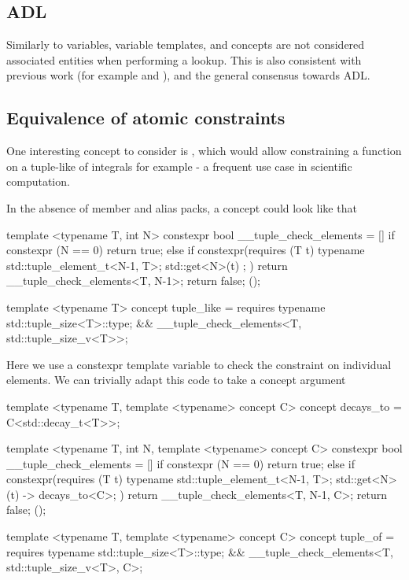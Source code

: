 \documentclass{wg21}
\begin{document}
\subsection{ADL}

Similarly to variables, variable templates, and concepts are not considered associated entities
when performing a lookup. This is also consistent with previous work (for example  and ),
and the general consensus towards ADL.

\subsection{Equivalence of atomic constraints}

One interesting concept to consider is , which would allow constraining a function on a tuple-like of integrals for example - a frequent use case in scientific
computation.

In the absence of member and alias packs, a  concept could look like that

\begin{colorblock}
template <typename T, int N>
constexpr bool __tuple_check_elements = [] {
    if constexpr (N == 0)
    return true;
    else if constexpr(requires (T t) {
        typename std::tuple_element_t<N-1, T>;
        { std::get<N>(t) };
    })
    return  __tuple_check_elements<T, N-1>;
    return false;
}();

template <typename T>
concept tuple_like = requires {
    typename std::tuple_size<T>::type;
} &&  __tuple_check_elements<T, std::tuple_size_v<T>>;
\end{colorblock}

Here we use a constexpr template variable to check the constraint on individual elements.
We can trivially adapt this code to take a concept argument

\begin{colorblock}
template <typename T, template <typename> concept C>
concept decays_to = C<std::decay_t<T>>;

template <typename T, int N, template <typename> concept C>
constexpr bool __tuple_check_elements = [] {
    if constexpr (N == 0)
    return true;
    else if constexpr(requires (T t) {
        typename std::tuple_element_t<N-1, T>;
        { std::get<N>(t) } -> decays_to<C>;
    })
    return  __tuple_check_elements<T, N-1, C>;
    return false;
}();

template <typename T, template <typename> concept C>
concept tuple_of = requires {
    typename std::tuple_size<T>::type;
} &&  __tuple_check_elements<T, std::tuple_size_v<T>, C>;
\end{colorblock}
\end{document}
